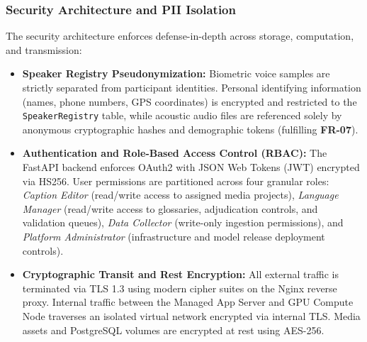 \documentclass[conference]{IEEEtran}
\begin{document}
\subsubsection{Security Architecture and PII Isolation}
\label{sec:design:gov:security}
The security architecture enforces defense-in-depth across storage, computation, and transmission:
\begin{itemize}
    \item \textbf{Speaker Registry Pseudonymization:} Biometric voice samples are strictly separated from participant identities. Personal identifying information (names, phone numbers, GPS coordinates) is encrypted and restricted to the \texttt{SpeakerRegistry} table, while acoustic audio files are referenced solely by anonymous cryptographic hashes and demographic tokens (fulfilling \textbf{FR-07}).
    \item \textbf{Authentication and Role-Based Access Control (RBAC):} The FastAPI backend enforces OAuth2 with JSON Web Tokens (JWT) encrypted via HS256. User permissions are partitioned across four granular roles: \textit{Caption Editor} (read/write access to assigned media projects), \textit{Language Manager} (read/write access to glossaries, adjudication controls, and validation queues), \textit{Data Collector} (write-only ingestion permissions), and \textit{Platform Administrator} (infrastructure and model release deployment controls).
    \item \textbf{Cryptographic Transit and Rest Encryption:} All external traffic is terminated via TLS 1.3 using modern cipher suites on the Nginx reverse proxy. Internal traffic between the Managed App Server and GPU Compute Node traverses an isolated virtual network encrypted via internal TLS. Media assets and PostgreSQL volumes are encrypted at rest using AES-256.
\end{itemize}
\end{document}
